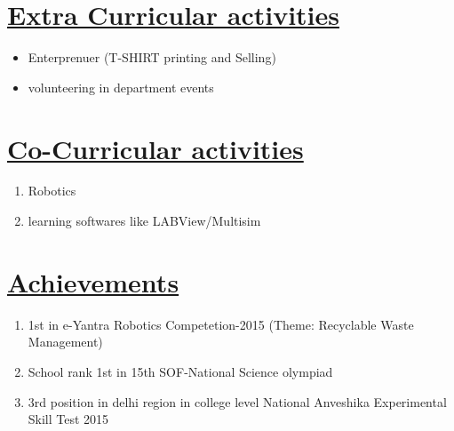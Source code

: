 \documentclass[14pt,a4paper,twoside]{article}
\begin{document}
	\section*{\underline{\textbf{Extra Curricular activities}}}
		\begin{itemize}
			\item Enterprenuer (T-SHIRT printing and Selling)
			\item volunteering in department events		
		\end{itemize}
		
	\section*{\underline{\textbf{Co-Curricular activities}}}
		\begin{enumerate}
			\item Robotics
			\item learning softwares like LABView/Multisim
		\end{enumerate}
		
	\section*{\underline{\textbf{Achievements}}}
		\begin{enumerate}
			\item 1st in e-Yantra Robotics Competetion-2015 (Theme: Recyclable Waste Management)
			\item School rank 1st in 15th SOF-National Science olympiad  
			\item 3rd position in delhi region in college level National Anveshika Experimental Skill Test 2015
		\end{enumerate}	
		
	
		
\end{document}
